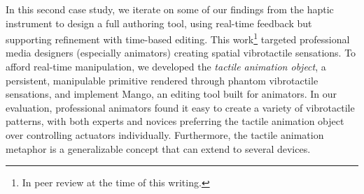   

In this second case study, we iterate on some of our findings from the haptic instrument to design a full authoring tool, using real-time feedback but supporting refinement with time-based editing.
This work\footnote{In peer review at the time of this writing.} targeted professional media designers (especially animators) creating spatial vibrotactile sensations.
To afford real-time manipulation, we developed the \emph{tactile animation object}, a persistent, manipulable primitive rendered through phantom vibrotactile sensations, and implement Mango, an editing tool built for animators.
In our evaluation,
professional animators found it easy to create a variety of
vibrotactile patterns, with both experts and novices preferring the tactile animation object over
controlling actuators individually.
Furthermore, the tactile animation metaphor is a generalizable concept that can extend to several devices.

  

  
%
%

